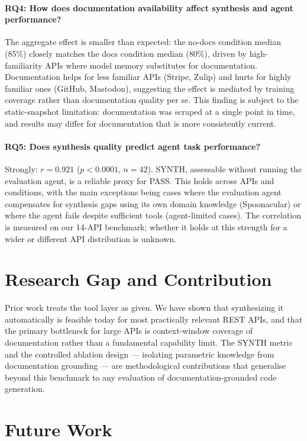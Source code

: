 \documentclass[12pt]{report}
\begin{document}
\paragraph{RQ4: How does documentation availability affect synthesis and
agent performance?}
The aggregate effect is smaller than expected: the no-docs condition median
(85\%) closely matches the docs condition median (80\%), driven by
high-familiarity APIs where model memory substitutes for documentation.
Documentation helps for less familiar APIs (Stripe, Zulip) and hurts for
highly familiar ones (GitHub, Mastodon), suggesting the effect is mediated
by training coverage rather than documentation quality per se. This finding
is subject to the static-snapshot limitation: documentation was scraped at
a single point in time, and results may differ for documentation that is
more consistently current.

\paragraph{RQ5: Does synthesis quality predict agent task performance?}
Strongly: $r = 0.921$ ($p < 0.0001$, $n = 42$). SYNTH, assessable without
running the evaluation agent, is a reliable proxy for PASS. This holds
across APIs and conditions, with the main exceptions being cases where the
evaluation agent compensates for synthesis gaps using its own domain
knowledge (Spoonacular) or where the agent fails despite sufficient tools
(agent-limited cases). The correlation is measured on our 14-API benchmark;
whether it holds at this strength for a wider or different API distribution
is unknown.

\section*{Research Gap and Contribution}

Prior work treats the tool layer as given. We have shown that synthesizing
it automatically is feasible today for most practically relevant REST APIs,
and that the primary bottleneck for large APIs is context-window coverage
of documentation rather than a fundamental capability limit. The SYNTH
metric and the controlled ablation design --- isolating parametric knowledge
from documentation grounding --- are methodological contributions that
generalise beyond this benchmark to any evaluation of documentation-grounded
code generation.

\section*{Future Work}
\end{document}
